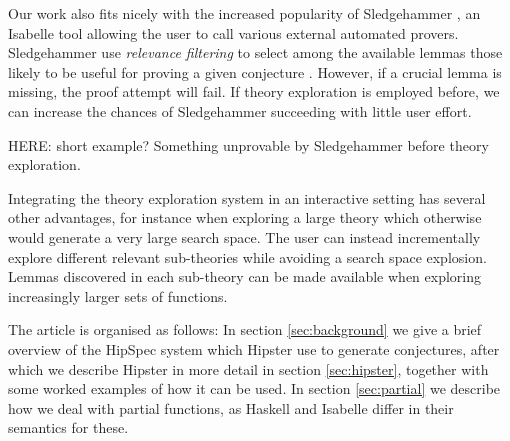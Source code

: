 Our work also fits nicely with the increased popularity of Sledgehammer \cite{sledgehammer}, an Isabelle tool allowing the user to call various external automated provers. Sledgehammer use \emph{relevance filtering} to select among the available lemmas those likely to be useful for proving a given conjecture \cite{mash}. However, if a crucial lemma is missing, the proof attempt will fail. If theory exploration is employed before, we can increase the chances of Sledgehammer succeeding with little user effort. 

HERE: short example? Something unprovable by Sledgehammer before theory exploration.


% 
Integrating the theory exploration system in an interactive setting has several other advantages, for instance when exploring a large theory which otherwise would generate a very large search space. The user can instead incrementally explore different relevant sub-theories while avoiding a search space explosion. Lemmas discovered in each sub-theory can be made available when exploring increasingly larger sets of functions. 

The article is organised as follows: In section \ref{sec:background} we give a brief overview of the HipSpec system which Hipster use to generate conjectures, after which we describe Hipster in more detail in section \ref{sec:hipster}, together with some worked examples of how it can be used. In section \ref{sec:partial} we describe how we deal with partial functions, as Haskell and Isabelle differ in their semantics for these. 
